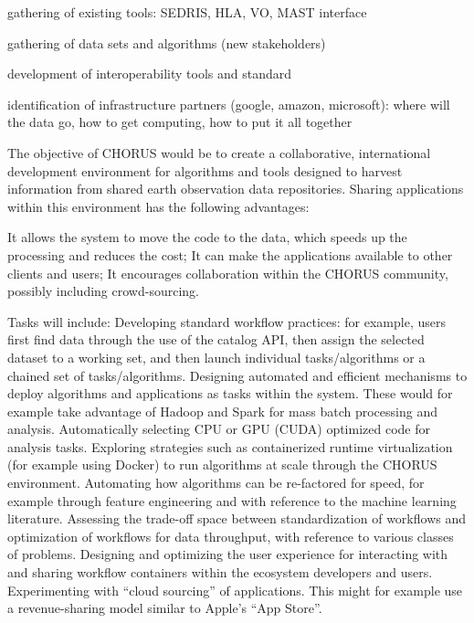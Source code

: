 gathering of existing tools: SEDRIS, HLA, VO, MAST interface

gathering of data sets and algorithms (new stakeholders)

development of interoperability tools and standard

identification of infrastructure partners (google, amazon, microsoft):
where will the data go, how to get computing, how to put it all together


The objective of CHORUS would be to create a collaborative, international development environment for algorithms and tools designed to harvest information from shared earth observation data repositories. Sharing applications within this environment has the following advantages:

	It allows the system to move the code to the data, which speeds up the processing and reduces the cost;
  It can make the applications available to other clients and users;
  It encourages collaboration within the CHORUS community, possibly including crowd-sourcing.

Tasks will include:
Developing standard workflow practices: for example, users first find data through the use of the catalog API, then assign the selected dataset to a working set, and then launch individual tasks/algorithms or a chained set of tasks/algorithms.
Designing automated and efficient mechanisms to deploy algorithms and applications as tasks within the system.  These would for example take advantage of Hadoop and Spark for mass batch processing and analysis.
Automatically selecting CPU or GPU (CUDA) optimized code for analysis tasks.
Exploring strategies such as containerized runtime virtualization (for example using Docker) to run algorithms at scale through the CHORUS environment.
Automating how algorithms can be re-factored for speed, for example through feature engineering and with reference to the machine learning literature.  
Assessing the trade-off space between standardization of workflows and optimization of workflows for data throughput, with reference to various classes of problems.
Designing and optimizing the user experience for interacting with and sharing workflow containers within the ecosystem developers and users.
Experimenting with “cloud sourcing” of applications.  This might for example use a revenue-sharing model similar to Apple’s “App Store”.

